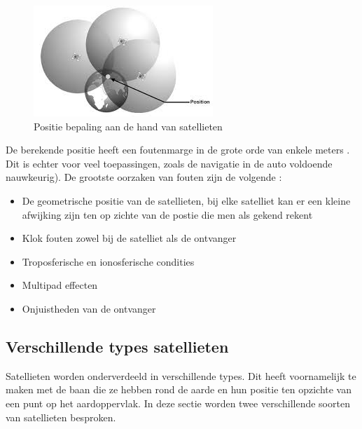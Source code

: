 \begin{figure}[hbp]
	\includegraphics[scale=1.65]{BepalingPositie.jpg}
	\centering
	\caption{Positie bepaling aan de hand van satellieten \cite{LBibSat}}
	\label{imgPbS}
\end{figure} 

De berekende positie heeft een foutenmarge in de grote orde van enkele meters . Dit is echter voor veel toepassingen, zoals de navigatie in de auto voldoende nauwkeurig). De grootste oorzaken van fouten zijn de volgende \cite{LBibGNSS8}:
\begin{itemize}
	\item De geometrische positie van de satellieten, bij elke satelliet kan er een kleine afwijking zijn ten op zichte van de postie die men als gekend rekent
	\item Klok fouten zowel bij de satelliet als de ontvanger
	\item Troposferische en ionosferische condities
	\item Multipad effecten
	\item Onjuistheden van de ontvanger
\end{itemize}

\subsection{Verschillende types satellieten}
\label{LVTS}
Satellieten worden onderverdeeld in verschillende types. Dit heeft voornamelijk te maken met de baan die ze hebben rond de aarde en hun positie ten opzichte van een punt op het aardoppervlak. In deze sectie worden twee verschillende soorten van satellieten besproken. 

